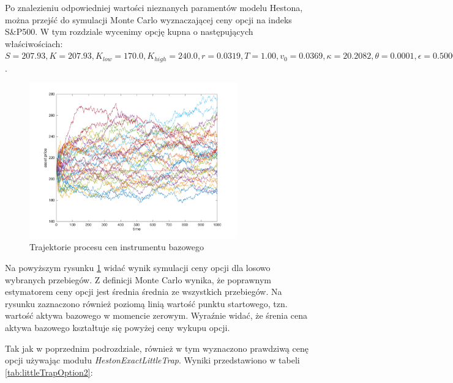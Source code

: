 \documentclass{pracamgr}
\begin{document}
Po znalezieniu odpowiedniej wartości nieznanych paramentów modelu Hestona, można 
przejść do symulacji Monte Carlo wyznaczającej ceny opcji na indeks S\&P500.
W tym rozdziale wycenimy opcję kupna o następujących właściwościach: 
   $S         = 207.93   
   ,K         = 207.93  
   ,K_{low}   = 170.0  
   ,K_{high}  = 240.0   
   ,r         = 0.0319  
   ,T         = 1.00   
   ,v_0       = 0.0369  
   ,\kappa    = 20.2082  
   ,\theta    = 0.0001  
   ,\epsilon  = 0.5000  
   ,\rho      = -0.90$.
\begin{figure}
\centering
  \includegraphics[width=0.80\textwidth]{../output/figures/chartHeston.png}
  \caption{Trajektorie procesu cen instrumentu bazowego}
  \label{fig:hestonAssetPaths}
\end{figure}

Na powyższym rysunku \ref{fig:hestonAssetPaths} widać wynik symulacji ceny opcji dla losowo wybranych przebiegów.
Z definicji Monte Carlo wynika, że poprawnym estymatorem ceny
opcji jest średnia średnia ze wszystkich przebiegów.
Na rysunku zaznaczono również poziomą linią wartość punktu startowego, tzn. wartość 
aktywa bazowego w momencie zerowym. Wyraźnie widać, że śrenia cena aktywa 
bazowego kształtuje się powyżej ceny wykupu opcji.

Tak jak w poprzednim podrozdziale, również w tym wyznaczono 
prawdziwą cenę opcji używając
modułu \textit{HestonExactLittleTrap}. Wyniki przedstawiono w tabeli
\ref{tab:littleTrapOption2}:
\end{document}
